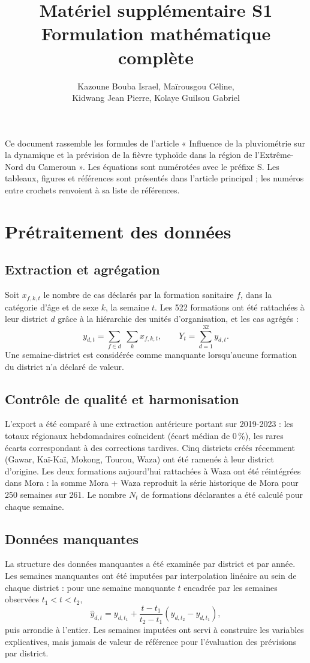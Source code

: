 \documentclass[11pt]{article}
\title{Matériel supplémentaire S1\\[0.6ex] \large Formulation mathématique complète}
\author{Kazoune Bouba Israel, Maïrousgou Céline,\\ Kidwang Jean Pierre, Kolaye Guilsou Gabriel}
\date{}
\begin{document}
\sloppy
\maketitle

\noindent Ce document rassemble les formules de l'article « Influence de la pluviométrie sur la dynamique et la prévision de la fièvre typhoïde dans la région de l'Extrême-Nord du Cameroun ». Les équations sont numérotées avec le préfixe S. Les tableaux, figures et références sont présentés dans l'article principal ; les numéros entre crochets renvoient à sa liste de références.

\section{Prétraitement des données}


\subsection{Extraction et agrégation}
Soit $x_{f,k,t}$ le nombre de cas déclarés par la formation sanitaire $f$, dans la catégorie d'âge et de sexe $k$, la semaine $t$. Les 522 formations ont été rattachées à leur district $d$ grâce à la hiérarchie des unités d'organisation, et les cas agrégés :
\begin{equation}
y_{d,t}=\sum_{f\in d}\;\sum_{k} x_{f,k,t}, \qquad Y_t=\sum_{d=1}^{32} y_{d,t}.
\label{eq:agg}
\end{equation}
Une semaine-district est considérée comme manquante lorsqu'aucune formation du district n'a déclaré de valeur.

\subsection{Contrôle de qualité et harmonisation}
L'export a été comparé à une extraction antérieure portant sur 2019-2023 : les totaux régionaux hebdomadaires coïncident (écart médian de 0\,\%), les rares écarts correspondant à des corrections tardives. Cinq districts créés récemment (Gawar, Kaï-Kaï, Mokong, Tourou, Waza) ont été ramenés à leur district d'origine. Les deux formations aujourd'hui rattachées à Waza ont été réintégrées dans Mora : la somme Mora + Waza reproduit la série historique de Mora pour 250 semaines sur 261. Le nombre $N_t$ de formations déclarantes a été calculé pour chaque semaine.

\subsection{Données manquantes}
La structure des données manquantes a été examinée par district et par année. Les semaines manquantes ont été imputées par interpolation linéaire au sein de chaque district : pour une semaine manquante $t$ encadrée par les semaines observées $t_1<t<t_2$,
\begin{equation}
\hat{y}_{d,t}=y_{d,t_1}+\frac{t-t_1}{t_2-t_1}\left(y_{d,t_2}-y_{d,t_1}\right),
\label{eq:interp}
\end{equation}
puis arrondie à l'entier. Les semaines imputées ont servi à construire les variables explicatives, mais jamais de valeur de référence pour l'évaluation des prévisions par district.
\end{document}
